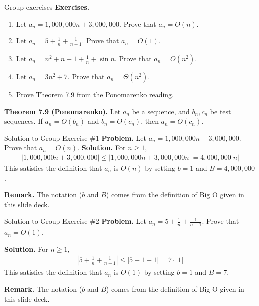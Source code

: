 \documentclass[10pt]{beamer}
\begin{document}
\begin{frame}{Group exercises}
\colorbox{green!30}{\textbf{Exercises.}}
\begin{enumerate}
	\item  Let $a_n = 1,000,000n + 3,000,000$. Prove that $a_n = O(n)$.
	\item Let $a_n = 5 + \frac{1}{n} + \frac{1}{n+1}$. Prove that $a_n = O(1)$.
	\item Let $a_n = n^2 + n + 1 + \frac{1}{n} + \sin n$. Prove that $a_n = O(n^2)$.
	\item Let $a_n = 3n^2 + 7$. Prove that $a_n = \Theta (n^2)$.
	\item Prove Theorem 7.9 from the Ponomarenko reading. 
\end{enumerate}

\vfill
\colorbox{red!30}{\textbf{Theorem 7.9 (Ponomarenko).}} Let $a_n$ be a sequence, and $b_n,c_n$ be test sequences.  If $a_n = O(b_n)$ and $b_n = O(c_n)$, then $a_n = O(c_n)$.
\end{frame}


\begin{frame}{Solution to Group Exercise \#1}
\textbf{Problem.} Let $a_n = 1,000,000n + 3,000,000$. Prove that $a_n = O(n)$.
\vfill 
\textbf{Solution.}
%
For $n \geq 1$,
\begin{align*}
|1,000,000n + 3,000,000| \leq |1,000,000n + 3,000,000n| = 4,000,000 |n| 
\end{align*}
This satisfies the definition that  $a_n$ is $O(n)$ by setting $b=1$ and $B= 4,000,000$.

\vfill 
\textbf{Remark.} The notation ($b$ and $B$) comes from the definition of Big O given in this slide deck.
\end{frame}

\begin{frame}{Solution to Group Exercise \#2}
\textbf{Problem.} Let $a_n = 5 + \frac{1}{n} + \frac{1}{n+1}$. Prove that $a_n = O(1)$.

\vfill 
\textbf{Solution.}
%
For $n \geq 1$,
\begin{align*}
|5 + \frac{1}{n} + \frac{1}{n+1}| \leq |5 + 1 + 1| = 7 \cdot |1| 
\end{align*}
This satisfies the definition that  $a_n$ is $O(1)$ by setting $b=1$ and $B=7$. 

\vfill 
\textbf{Remark.} The notation ($b$ and $B$) comes from the definition of Big O given in this slide deck.

\end{frame}
\end{document}
